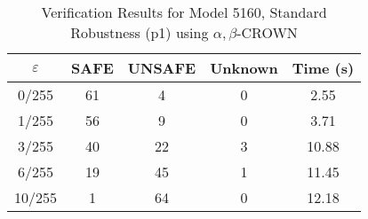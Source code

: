 \begin{table}[htbp]
\centering
\caption{Verification Results for Model 5160, Standard Robustness (p1) using $\alpha,\beta$-CROWN}
\label{tab:model5160_p1_abcrown}
\begin{tabular}{|c|c|c|c|c|}
\hline
$\varepsilon$ & SAFE & UNSAFE & Unknown & Time (s) \\ \hline
0/255 & 61 & 4 & 0 & 2.55 \\ \hline
1/255 & 56 & 9 & 0 & 3.71 \\ \hline
3/255 & 40 & 22 & 3 & 10.88 \\ \hline
6/255 & 19 & 45 & 1 & 11.45 \\ \hline
10/255 & 1 & 64 & 0 & 12.18 \\ \hline
\end{tabular}
\end{table}
